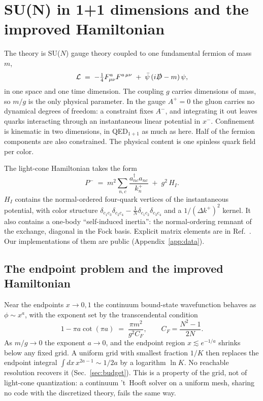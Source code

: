 \section{SU(N) in 1+1 dimensions and the improved Hamiltonian}
\label{sec:sun}

The theory is SU($N$) gauge theory coupled to one fundamental fermion of
mass $m$,
\begin{equation}
  \mathcal{L} \;=\; -\tfrac14 F^a_{\mu\nu}F^{a\,\mu\nu}
  \;+\; \bar\psi\,(i\slashed{D} - m)\,\psi ,
  \label{eq:lagrangian}
\end{equation}
in one space and one time dimension.  The coupling $g$ carries dimensions
of mass, so $m/g$ is the only physical parameter.  In the gauge $A^+ = 0$
the gluon carries no dynamical degrees of freedom: a constraint fixes
$A^-$, and integrating it out leaves quarks interacting through an
instantaneous linear potential in $x^-$.  Confinement is kinematic in two
dimensions, in QED$_{1+1}$ as much as here.  Half of the fermion components
are also constrained.  The physical content is one spinless quark field per
color.

The light-cone Hamiltonian takes the form
\begin{equation}
  P^- \;=\; m^2 \sum_{n,c} \frac{a^\dagger_{n c} a_{n c}}{k^+_n}
        \;+\; g^2\, H_I .
  \label{eq:pminus}
\end{equation}
$H_I$ contains the normal-ordered four-quark vertices of the instantaneous
potential, with color structure
$\delta_{c_1 c_3}\delta_{c_2 c_4} - \tfrac1N \delta_{c_1 c_2}\delta_{c_3 c_4}$
and a $1/(\Delta k^+)^2$ kernel.  It also contains a one-body
``self-induced inertia'': the normal-ordering remnant of the exchange,
diagonal in the Fock basis.  Explicit matrix elements are in
Ref.~\cite{Hornbostel:1988fb}.  Our implementations of them are public
(Appendix~\ref{app:data}).

\subsection{The endpoint problem and the improved Hamiltonian}
\label{sec:improved}

Near the endpoints $x \to 0, 1$ the continuum bound-state wavefunction
behaves as $\phi \sim x^{a}$, with the exponent set by the transcendental
condition~\cite{tHooft:1974pnl,Hornbostel:1988fb}
\begin{equation}
  1 - \pi a \cot(\pi a) \;=\; \frac{\pi m^2}{g^2 C_F},
  \qquad C_F = \frac{N^2-1}{2N} .
  \label{eq:endpoint-exponent}
\end{equation}
As $m/g \to 0$ the exponent $a \to 0$, and the endpoint region
$x \lesssim e^{-1/a}$ shrinks below any fixed grid.  A uniform grid with
smallest fraction $1/K$ then replaces the endpoint integral
$\int dx\, x^{2a-1} \sim 1/2a$ by a logarithm $\ln K$.  No reachable
resolution recovers it (Sec.~\ref{sec:budget}).  This is a property of the
grid, not of light-cone quantization: a continuum 't~Hooft solver on a
uniform mesh, sharing no code with the discretized theory, fails the same
way.

